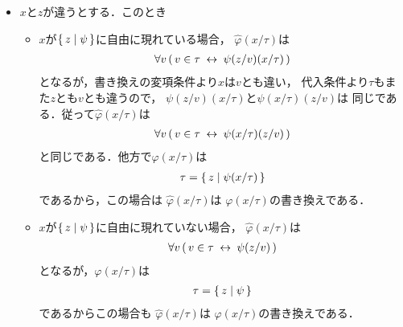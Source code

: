 \begin{metaprf}[第一]
\begin{description}
\begin{description}
\begin{itemize}
							\item $x$と$z$が違うとする．このとき
								\begin{itemize}
									\item $x$が$\{\, z \mid \psi\, \}$に自由に現れている場合，
										$\widehat{\varphi}(x/\tau)$は
										\begin{align}
											\forall v\, (\, v \in \tau \hspace{0.25em}\leftrightarrow\hspace{0.25em} \psi(z/v)(x/\tau)\, )
										\end{align}
										となるが，書き換えの変項条件より$x$は$v$とも違い，
										代入条件より$\tau$もまた$z$とも$v$とも違うので，
										$\psi(z/v)(x/\tau)$と$\psi(x/\tau)(z/v)$は
										同じである．従って$\widehat{\varphi}(x/\tau)$は
										\begin{align}
											\forall v\, (\, v \in \tau \hspace{0.25em}\leftrightarrow\hspace{0.25em} \psi(x/\tau)(z/v)\, )
										\end{align}
										と同じである．他方で$\varphi(x/\tau)$は
										\begin{align}
											\tau = \{\, z \mid \psi(x/\tau)\, \}
										\end{align}
										であるから，この場合は
										$\widehat{\varphi}(x/\tau)$は
										$\varphi(x/\tau)$の書き換えである．
										
									\item $x$が$\{\, z \mid \psi\, \}$に自由に現れていない場合，
										$\widehat{\varphi}(x/\tau)$は
										\begin{align}
											\forall v\, (\, v \in \tau \hspace{0.25em}\leftrightarrow\hspace{0.25em} \psi(z/v)\, )
										\end{align}
										となるが，$\varphi(x/\tau)$は
										\begin{align}
											\tau = \{\, z \mid \psi\, \}
										\end{align}
										であるからこの場合も
										$\widehat{\varphi}(x/\tau)$は
										$\varphi(x/\tau)$の書き換えである．
								\end{itemize}
						\end{itemize}
						

\end{description}
\end{description}
\end{metaprf}
